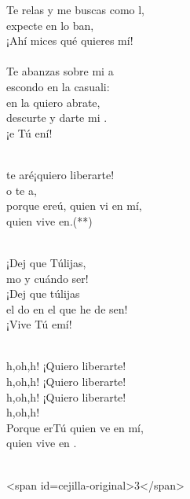 \begin{cancion}[En lo Hondo][Hakuna]
	Te relas y me buscas como l,\\
	expecte en lo ban,\\
	¡Ahí mices qué quieres  mí!\\
\jump\\
	Te abanzas sobre mi a\\
	escondo en la casuali:\\
	en la quiero abrate,\\
	descurte y darte mi . \\
	¡e Tú ení! \\\jump\\
	\begin{chorus}%
	te aré¡quiero liberarte! \\
	o te a, \\
	porque ereú, quien vi en mí,\\
	quien vive en.(**)\\
	\end{chorus}%
	\jump\\
	¡Dej que Túlijas,  \\
	mo y cuándo ser! \\
	¡Dej que túlijas  \\
	el do en el que he de sen!\\
	¡Vive Tú emí!\\\jump\\
	\begin{chorus}%
	h,oh,h! ¡Quiero liberarte!\\
	h,oh,h! ¡Quiero liberarte!\\
	h,oh,h! ¡Quiero liberarte!\\
	h,oh,h!\\
	Porque erTú quien ve en mí,\\
	quien vive en . \\
	\end{chorus}%
	\jump\\
<span id=cejilla-original>3</span>\\
\end{cancion}%
